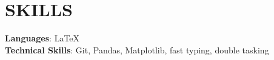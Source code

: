   \section{SKILLS} 
  \small{\textbf{Languages}: LaTeX}\\
  \small{\textbf{Technical Skills}: Git, Pandas, Matplotlib, fast typing, double tasking} \\
  